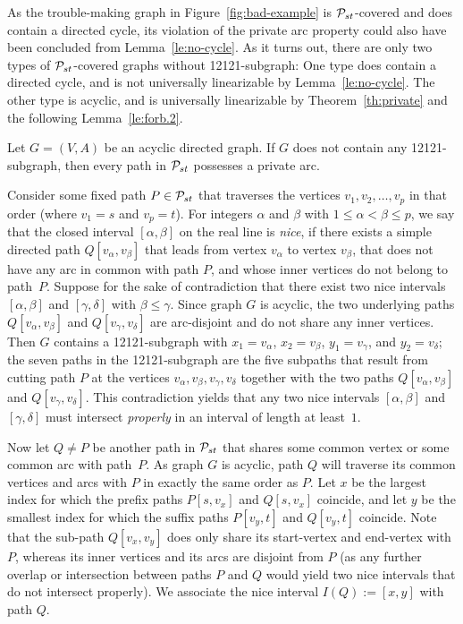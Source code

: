 \documentclass[11pt,fleqn]{article}
\begin{document}
As the trouble-making graph in Figure~\ref{fig:bad-example} is ${\cal P}_{st}$-covered and 
does contain a directed cycle, its violation of the private arc property could also have 
been concluded from Lemma~\ref{le:no-cycle}.
As it turns out, there are only two types of ${\cal P}_{st}$-covered graphs without 12121-subgraph:
One type does contain a directed cycle, and is not universally linearizable by Lemma~\ref{le:no-cycle}.
The other type is acyclic, and is universally linearizable by Theorem~\ref{th:private} and 
the following Lemma~\ref{le:forb.2}.
\begin{lemma}
\label{le:forb.2}
Let $G=(V,A)$ be an acyclic directed graph.
If $G$ does not contain any 12121-subgraph,
then every path in ${\cal P}_{st}$ possesses a private arc.
\end{lemma}
\proof
Consider some fixed path $P\in{\cal P}_{st}$ that traverses the vertices $v_1,v_2,\ldots,v_p$ in 
that order (where $v_1=s$ and $v_p=t$).
For integers $\alpha$ and $\beta$ with $1\le\alpha<\beta\le p$, we say that the closed interval 
$[\alpha,\beta]$ on the real line is \emph{nice}, if there exists a simple directed path 
$Q[v_{\alpha},v_{\beta}]$ that leads from vertex $v_{\alpha}$ to vertex $v_{\beta}$, that does 
not have any arc in common with path $P$, and whose inner vertices do not belong to path~$P$.
Suppose for the sake of contradiction that there exist two nice intervals $[\alpha,\beta]$ and $[\gamma,\delta]$ 
with $\beta\le\gamma$.
Since graph $G$ is acyclic, the two underlying paths $Q[v_{\alpha},v_{\beta}]$ and $Q[v_{\gamma},v_{\delta}]$ 
are arc-disjoint and do not share any inner vertices.
Then $G$ contains a 12121-subgraph with $x_1=v_{\alpha}$, $x_2=v_{\beta}$, $y_1=v_{\gamma}$, and $y_2=v_{\delta}$;
the seven paths in the 12121-subgraph are the five subpaths that result from cutting path $P$ 
at the vertices $v_{\alpha},v_{\beta},v_{\gamma},v_{\delta}$ together with the two paths 
$Q[v_{\alpha},v_{\beta}]$ and $Q[v_{\gamma},v_{\delta}]$.
This contradiction yields that any two nice intervals $[\alpha,\beta]$ and $[\gamma,\delta]$ 
must intersect \emph{properly} in an interval of length at least~$1$.

Now let $Q\ne P$ be another path in ${\cal P}_{st}$ that shares some common vertex or some common arc with path~$P$. 
As graph $G$ is acyclic, path $Q$ will traverse its common vertices and arcs with $P$ in exactly 
the same order as $P$.
Let $x$ be the largest  index for which the prefix paths $P[s,v_x]$ and $Q[s,v_x]$ coincide, and
let $y$ be the smallest index for which the suffix paths $P[v_y,t]$ and $Q[v_y,t]$ coincide.
Note that the sub-path $Q[v_x,v_y]$ does only share its start-vertex and end-vertex with $P$, 
whereas its inner vertices and its arcs are disjoint from $P$ (as any further overlap or intersection 
between paths $P$ and $Q$ would yield two nice intervals that do not intersect properly).
We associate the nice interval $I(Q):=[x,y]$ with path $Q$.
\end{document}
